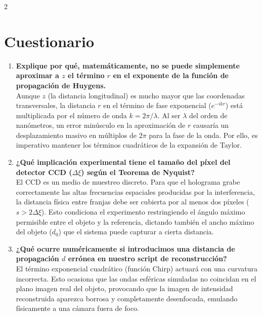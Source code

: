 \documentclass[letterpaper]{article}
\begin{document}
\begin{multicols}{2}
		\section*{Cuestionario}
		\begin{enumerate}
			\item \textbf{Explique por qué, matemáticamente, no se puede simplemente aproximar a $z$ el término $r$ en el exponente de la función de propagación de Huygens.}\\
			Aunque $z$ (la distancia longitudinal) es mucho mayor que las coordenadas transversales, la distancia $r$ en el término de fase exponencial ($e^{-ikr}$) está multiplicada por el número de onda $k = 2\pi/\lambda$. Al ser $\lambda$ del orden de nanómetros, un error minúsculo en la aproximación de $r$ causaría un desplazamiento masivo en múltiplos de $2\pi$ para la fase de la onda. Por ello, es imperativo mantener los términos cuadráticos de la expansión de Taylor.
			
			\item \textbf{¿Qué implicación experimental tiene el tamaño del píxel del detector CCD ($\Delta\xi$) según el Teorema de Nyquist?}\\
			El CCD es un medio de muestreo discreto. Para que el holograma grabe correctamente las altas frecuencias espaciales producidas por la interferencia, la distancia física entre franjas debe ser cubierta por al menos dos píxeles ($s > 2\Delta\xi$). Esto condiciona el experimento restringiendo el ángulo máximo permisible entre el objeto y la referencia, dictando también el ancho máximo del objeto ($d_0$) que el sistema puede capturar a cierta distancia.
			
			\item \textbf{¿Qué ocurre numéricamente si introducimos una distancia de propagación $d$ errónea en nuestro script de reconstrucción?}\\
			El término exponencial cuadrático (función Chirp) actuará con una curvatura incorrecta. Esto ocasiona que las ondas esféricas simuladas no coincidan en el plano imagen real del objeto, provocando que la imagen de intensidad reconstruida aparezca borrosa y completamente desenfocada, emulando físicamente a una cámara fuera de foco.
		\end{enumerate}
		

\end{multicols}
\end{document}
